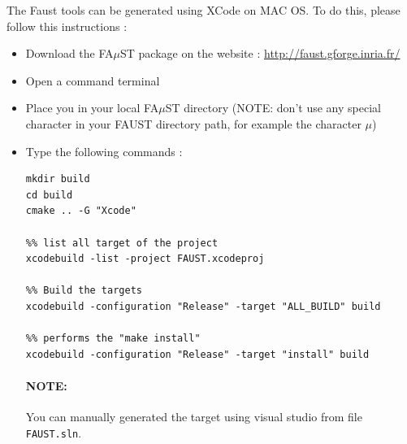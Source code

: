 The Faust tools can be generated using XCode on MAC OS. To do this, please follow this instructions :
\begin{itemize}
\item Download the FA$\mu$ST package on the website :  \url{http://faust.gforge.inria.fr/}
\item Open a command terminal
\item Place you in your local FA$\mu$ST directory (NOTE: don't use any special character in your FAUST directory path, for example the character $\mu$)
\item Type the following commands : 
\begin{lstlisting}
mkdir build
cd build
cmake .. -G "Xcode"

%% list all target of the project
xcodebuild -list -project FAUST.xcodeproj 

%% Build the targets
xcodebuild -configuration "Release" -target "ALL_BUILD" build 

%% performs the "make install"
xcodebuild -configuration "Release" -target "install" build 
\end{lstlisting}

\paragraph{NOTE:}You can manually generated the target using visual studio from file \texttt{FAUST.sln}.

 
\end{itemize} 
